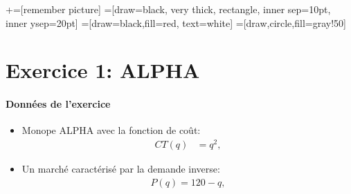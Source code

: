 


\usetikzlibrary{positioning}
\usetikzlibrary{snakes}
\usetikzlibrary{calc}
\usetikzlibrary{arrows}
\usetikzlibrary{decorations.markings}
\usetikzlibrary{shapes.misc}
\usetikzlibrary{matrix,shapes,arrows,fit,tikzmark}
\usetikzlibrary{matrix,chains,positioning,decorations.pathreplacing,arrows}
\usetikzlibrary{shapes}
\usetikzlibrary{shapes.geometric, arrows}
\newcommand\marktopleft[1]{
    \tikz[overlay,remember picture] 
        \node (marker-#1-a) at (-.3em,.3em) {};%
}
\newcommand\markbottomright[2]{%
    \tikz[overlay,remember picture] 
        \node (marker-#1-b) at (0em,0em) {};%
}
+=[remember picture] 
 =[draw=black, very thick, rectangle, inner sep=10pt, inner ysep=20pt]
 =[draw=black,fill=red, text=white]
=[draw,circle,fill=gray!50]

\begin{frame}
\titlepage
\end{frame}
\begin{frame}
 \tableofcontents
    \end{frame}

\section{Exercice 1: ALPHA }
\frame{\sectionpage}
\begin{frame}
[allowframebreaks]{\insertsection}
\framesubtitle{Données de l'exercice \\}
\begin{itemize}
    \item Monope ALPHA avec la fonction de coût:
    \begin{align}
    CT(q) &= q^2,
    \label{eq1}
    \end{align}
   \item Un marché caractérisé par la demande inverse:
   \begin{align}
     P(q)=120-q,
     \label{eq2}
   \end{align}
\end{itemize}
    \end{frame}

